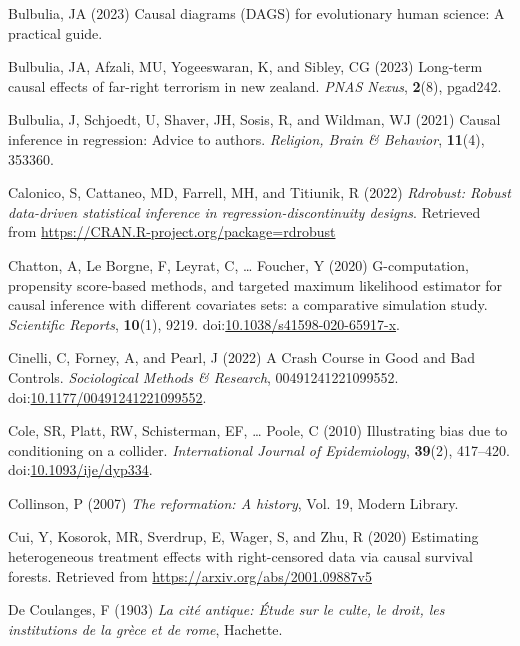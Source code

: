 \documentclass[
  singlecolumn,
  9pt]{article}
\begin{document}
\begin{CSLReferences}
Bulbulia, JA (2023) Causal diagrams (DAGS) for evolutionary human
science: A practical guide.

Bulbulia, JA, Afzali, MU, Yogeeswaran, K, and Sibley, CG (2023)
Long-term causal effects of far-right terrorism in new zealand.
\emph{PNAS Nexus}, \textbf{2}(8), pgad242.

Bulbulia, J, Schjoedt, U, Shaver, JH, Sosis, R, and Wildman, WJ (2021)
Causal inference in regression: Advice to authors. \emph{Religion, Brain
\& Behavior}, \textbf{11}(4), 353360.

Calonico, S, Cattaneo, MD, Farrell, MH, and Titiunik, R (2022)
\emph{Rdrobust: Robust data-driven statistical inference in
regression-discontinuity designs}. Retrieved from
\url{https://CRAN.R-project.org/package=rdrobust}

Chatton, A, Le Borgne, F, Leyrat, C, \ldots{} Foucher, Y (2020)
G-computation, propensity score-based methods, and targeted maximum
likelihood estimator for causal inference with different covariates
sets: a comparative simulation study. \emph{Scientific Reports},
\textbf{10}(1), 9219.
doi:\href{https://doi.org/10.1038/s41598-020-65917-x}{10.1038/s41598-020-65917-x}.

Cinelli, C, Forney, A, and Pearl, J (2022) A Crash Course in Good and
Bad Controls. \emph{Sociological Methods \& Research},
00491241221099552.
doi:\href{https://doi.org/10.1177/00491241221099552}{10.1177/00491241221099552}.

Cole, SR, Platt, RW, Schisterman, EF, \ldots{} Poole, C (2010)
Illustrating bias due to conditioning on a collider. \emph{International
Journal of Epidemiology}, \textbf{39}(2), 417--420.
doi:\href{https://doi.org/10.1093/ije/dyp334}{10.1093/ije/dyp334}.

Collinson, P (2007) \emph{The reformation: A history}, Vol. 19, Modern
Library.

Cui, Y, Kosorok, MR, Sverdrup, E, Wager, S, and Zhu, R (2020) Estimating
heterogeneous treatment effects with right-censored data via causal
survival forests. Retrieved from
\url{https://arxiv.org/abs/2001.09887v5}

De Coulanges, F (1903) \emph{La cité antique: Étude sur le culte, le
droit, les institutions de la grèce et de rome}, Hachette.


\end{CSLReferences}
\end{document}
